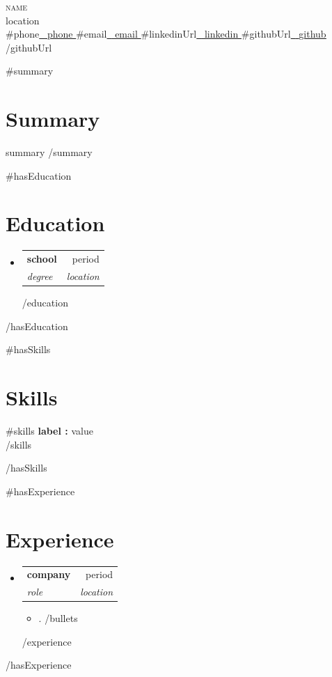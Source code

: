 \documentclass[letterpaper,11pt]{article}
\makeatletter
\newcommand{\resumeItem}[1]{\item\small{{#1 \vspace{-2pt}}}}
\newcommand{\resumeSubheading}[4]{
  \vspace{-2pt}\item
    \begin{tabular*}{0.97\textwidth}[t]{l@{\extracolsep{\fill}}r}
      \textbf{#1} & #2 \\
      \textit{\small#3} & \textit{\small #4} \\
    \end{tabular*}\vspace{-7pt}
}
\newcommand{\resumeSubHeadingListStart}{\begin{itemize}[leftmargin=0.15in, label={}]}
\newcommand{\resumeSubHeadingListEnd}{\end{itemize}}
\newcommand{\resumeItemListStart}{\begin{itemize}}
\newcommand{\resumeItemListEnd}{\end{itemize}\vspace{-5pt}}
\makeatother
\begin{document}
\begin{center}
    {\Huge \scshape {{ name }} } \\ \vspace{2pt}
    {{ location }}\\ \vspace{4pt}
    \small
    {{#phone}}\href{tel:{{{ phone }}}}{\raisebox{-0.1\height}\faPhone\ \underline{ {{ phone }} }} 
    {{#email}}\href{mailto:{{{ email }}}}{\raisebox{-0.5\height}\faEnvelope\ \underline{ {{ email }} }} 
    {{#linkedinUrl}}\href{ {{{ linkedinUrl }}} }{\raisebox{-0.2\height}\faLinkedin\ \underline{ {{ linkedin }} }} 
    {{#githubUrl}}\href{ {{{ githubUrl }}} }{\raisebox{-0.2\height}\faGithub\ \underline{ {{ github }} }}{{/githubUrl}}
\end{center}

{{#summary}}
\section{Summary}
\small{ {{ summary }} }
\vspace{-4pt}
{{/summary}}

{{#hasEducation}}
\section{Education}
\resumeSubHeadingListStart
{{#education}}
  \resumeSubheading
    { {{ school }} }{ {{ period }} }
    { {{ degree }} }{ {{ location }} }
{{/education}}
\resumeSubHeadingListEnd
{{/hasEducation}}

{{#hasSkills}}
\section{Skills}
\begin{itemize}[leftmargin=0.15in, label={}]
    \small{\item{
{{#skills}}     \textbf{ {{ label }}:} {{ value }} \\
{{/skills}}    }}
\end{itemize}
\vspace{-16pt}
{{/hasSkills}}

{{#hasExperience}}
\section{Experience}
  \resumeSubHeadingListStart
{{#experience}}
\resumeSubheading
{ {{ company }} }{ {{ period }} }
{ {{ role }} }{ {{ location }} }
\resumeItemListStart
{{#bullets}}\resumeItem{ {{ . }} }
{{/bullets}}\resumeItemListEnd
{{/experience}}
  \resumeSubHeadingListEnd
{{/hasExperience}}
\end{document}
